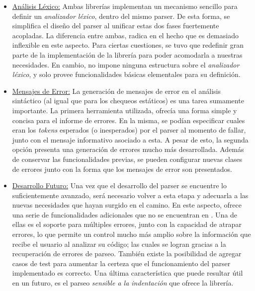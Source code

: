 \begin{itemize}
    \item \underline{Análisis Léxico:}
    Ambas librerías implementan un mecanismo sencillo para definir un \textit{analizador léxico}, dentro del mismo parser.
    De esta forma, se simplifica el diseño del parser al unificar estas dos fases fuertemente acopladas.
    La diferencia entre ambas, radica en el hecho que \Parsec{} es demasiado inflexible en este aspecto.
    Para ciertas cuestiones, se tuvo que redefinir gran parte de la implementación de la librería para poder acomodarla a nuestras necesidades.
    En cambio, \Megaparsec{} no impone ninguna estructura sobre el \textit{analizador léxico}, y solo provee funcionalidades básicas elementales para su definición.
    \item \underline{Mensajes de Error:}
    La generación de mensajes de error en el análisis sintáctico (al igual que para los chequeos estáticos) es una tarea sumamente importante. %
    La primera herramienta utilizada, ofrecía una forma simple y concisa para el informe de errores.
    En la misma, se podían especificar cuales eran los \textit{tokens} esperados (o inesperados) por el parser al momento de fallar, junto con el mensaje informativo asociado a esta.
    A pesar de esto, la segunda opción presenta una generación de errores mucho más desarrollada.
    Además de conservar las funcionalidades previas, se pueden configurar nuevas clases de errores junto con la forma que los mensajes de error son presentados. %
    \item \underline{Desarrollo Futuro:}
    Una vez que el desarrollo del parser se encuentre lo suficientemente avanzado, será necesario volver a esta etapa y adecuarla a las nuevas necesidades que hayan surgido en el camino.
    En este aspecto, \Megaparsec{} ofrece una serie de funcionalidades adicionales que no se encuentran en \Parsec{}.
    Una de ellas es el soporte para múltiples errores, junto con la capacidad de atrapar errores, lo que permite un control mucho más amplio sobre la información que recibe el usuario al analizar su código; las cuales se logran gracias a la recuperación de errores de parseo.
    También existe la posibilidad de agregar casos de test para aumentar la certeza que el funcionamiento del parser implementado es correcto.
    Una última característica que puede resultar útil en un futuro, es el parseo \textit{sensible a la indentación} que ofrece la librería.
\end{itemize}

